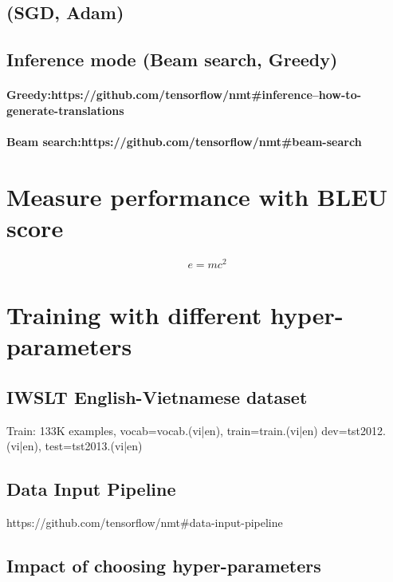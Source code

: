 \documentclass[preprint,12pt]{elsarticle}
\begin{document}
\subsection{(SGD, Adam)}

\subsection{Inference mode (Beam search, Greedy)}

\paragraph{\textbf{Greedy}:https://github.com/tensorflow/nmt#inference--how-to-generate-translations}

\paragraph{\textbf{Beam search}:https://github.com/tensorflow/nmt#beam-search}

\section{Measure performance with BLEU score}
\label{S:2}

\begin{equation}
\label{eq:emc}
e = mc^2
\end{equation}

\section{Training with different hyper-parameters}
\label{S:3}

\subsection{IWSLT English-Vietnamese dataset}
Train: 133K examples, vocab=vocab.(vi|en), train=train.(vi|en) dev=tst2012.(vi|en), test=tst2013.(vi|en)

\subsection{Data Input Pipeline}
https://github.com/tensorflow/nmt#data-input-pipeline

\subsection{Impact of choosing hyper-parameters}
\end{document}
